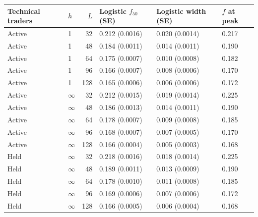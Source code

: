 \begin{center}
\begin{minipage}{\linewidth}\centering
\captionsetup{type=table,hypcap=false}
\caption{Comparison of logistic fits with interpolation between tested fractions. Parentheses give seed-bootstrap standard errors (SE), not binomial standard errors treating fractions as independent. The last column is the location of the empirical susceptibility maximum: it is a sampled fraction with local grid resolution, not an interpolated optimum.}
\label{tab:revision-fits}
\small
\begin{tabular}{llrlll}
\toprule
Technical traders & $h$ & $L$ & Logistic $f_{50}$ (SE) & Logistic width (SE) & $f$ at peak \\
\midrule
Active & 1 & 32 & 0.212 (0.0016) & 0.020 (0.0014) & 0.217 \\
Active & 1 & 48 & 0.184 (0.0011) & 0.014 (0.0011) & 0.190 \\
Active & 1 & 64 & 0.175 (0.0007) & 0.010 (0.0008) & 0.182 \\
Active & 1 & 96 & 0.166 (0.0007) & 0.008 (0.0006) & 0.170 \\
Active & 1 & 128 & 0.165 (0.0006) & 0.006 (0.0006) & 0.172 \\
\midrule
Active & $\infty$ & 32 & 0.212 (0.0015) & 0.019 (0.0014) & 0.225 \\
Active & $\infty$ & 48 & 0.186 (0.0013) & 0.014 (0.0011) & 0.190 \\
Active & $\infty$ & 64 & 0.178 (0.0007) & 0.009 (0.0008) & 0.185 \\
Active & $\infty$ & 96 & 0.168 (0.0007) & 0.007 (0.0005) & 0.170 \\
Active & $\infty$ & 128 & 0.166 (0.0004) & 0.005 (0.0003) & 0.168 \\
\midrule
Held & $\infty$ & 32 & 0.218 (0.0016) & 0.018 (0.0014) & 0.225 \\
Held & $\infty$ & 48 & 0.189 (0.0011) & 0.013 (0.0009) & 0.190 \\
Held & $\infty$ & 64 & 0.178 (0.0010) & 0.011 (0.0008) & 0.185 \\
Held & $\infty$ & 96 & 0.169 (0.0006) & 0.007 (0.0006) & 0.172 \\
Held & $\infty$ & 128 & 0.166 (0.0005) & 0.006 (0.0004) & 0.168 \\
\bottomrule
\end{tabular}
\end{minipage}
\end{center}
